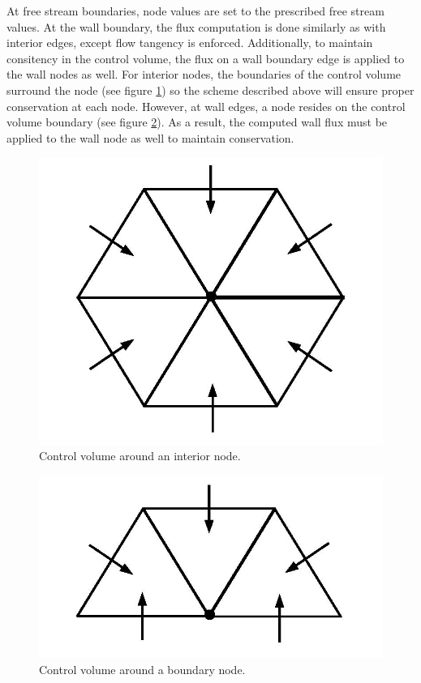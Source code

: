 \documentclass[12pt]{article}
\begin{document}
At free stream boundaries, node values are set to the prescribed free stream values. At the wall boundary, the flux computation is done similarly as with interior edges, except flow tangency is enforced. Additionally, to maintain consitency in the control volume, the flux on a wall boundary edge is applied to the wall nodes as well. For interior nodes, the boundaries of the control volume surround the node (see figure \ref{fullcv}) so the scheme described above will ensure proper conservation at each node. However, at wall edges, a node resides on the control volume boundary (see figure \ref{wallcv}). As a result, the computed wall flux must be applied to the wall node as well to maintain conservation.

 \begin{figure}[htbp]
 \begin{center}
 \includegraphics[scale=0.25]{figs/fullcv.jpg}
 \caption{Control volume around an interior node.} \label{fullcv}
 \end{center}
 \end{figure}

 \begin{figure}[htbp]
 \begin{center}
 \includegraphics[scale=0.25]{figs/wallcv.jpg}
 \caption{Control volume around a boundary node.} \label{wallcv}
 \end{center}
 \end{figure}
 
\end{document}
